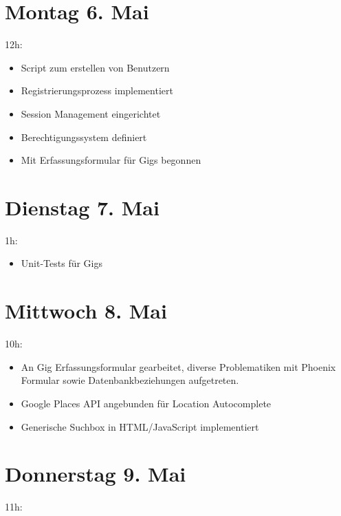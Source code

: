 \section{Montag 6. Mai}\label{montag-6.mai}

12h:

\begin{itemize}
  \tightlist
  \item
        Script zum erstellen von Benutzern
  \item
        Registrierungsprozess implementiert
  \item
        Session Management eingerichtet
  \item
        Berechtigungssystem definiert
  \item
        Mit Erfassungsformular für Gigs begonnen
\end{itemize}

\section{Dienstag 7. Mai}\label{dienstag-7.mai}

1h:

\begin{itemize}
  \tightlist
  \item
        Unit-Tests für Gigs
\end{itemize}

\section{Mittwoch 8. Mai}\label{mittwoch-8.mai}

10h:

\begin{itemize}
  \tightlist
  \item
        An Gig Erfassungsformular gearbeitet, diverse Problematiken mit
        Phoenix Formular sowie Datenbankbeziehungen aufgetreten.
  \item
        Google Places API angebunden für Location Autocomplete
  \item
        Generische Suchbox in HTML/JavaScript implementiert
\end{itemize}

\section{Donnerstag 9. Mai}\label{donnerstag-9.mai}

11h:


